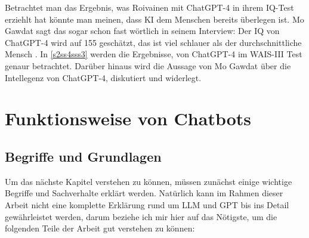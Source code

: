 	Betrachtet man das Ergebnis, was Roivainen mit ChatGPT-4 in ihrem IQ-Test erziehlt hat könnte man meinen,
	dass KI dem Menschen bereits überlegen ist. Mo Gawdat sagt das sogar schon fast wörtlich in seinem Interview:
	\glqq{}Der IQ von ChatGPT-4 wird auf 155 geschätzt, das ist viel schlauer als der durchschnittliche Mensch\grqq{} 
	\cite{gawdat23}. In \ref{s2ss4sss3} werden die Ergebnisse, von ChatGPT-4 im WAIS-III Test genaur betrachtet.
	Darüber hinaus wird die Aussage von Mo Gawdat über die Intellegenz von ChatGPT-4, diskutiert und widerlegt. 	

\clearpage	
\section{Funktionsweise von Chatbots}
	\subsection{Begriffe und Grundlagen}\label{s2ss1}
	Um das nächste Kapitel verstehen zu können, müssen zunächst einige wichtige Begriffe und Sachverhalte erklärt 
	werden. Natürlich kann im Rahmen dieser Arbeit nicht eine komplette Erklärung rund um LLM und GPT bis ins Detail
	gewährleistet werden, darum beziehe ich mir hier auf das Nötigste, um die folgenden Teile der Arbeit gut verstehen
	zu können: 
	
